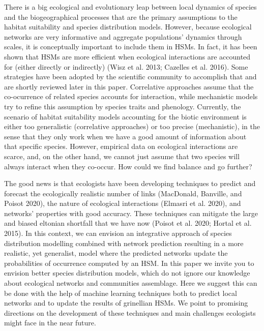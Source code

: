 \documentclass[11pt]{article}
\begin{document}
There is a big ecological and evolutionary leap between local dynamics
of species and the biogeographical processes that are the primary
assumptions to the habitat suitability and species distribution models.
However, because ecological networks are very informative and aggregate
populations' dynamics through scales, it is conceptually important to
include them in HSMs. In fact, it has been shown that HSMs are more
efficient when ecological interactions are accounted for (either
directly or indirectly) (Wisz et al. 2013; Cazelles et al. 2016). Some
strategies have been adopted by the scientific community to accomplish
that and are shortly reviewed later in this paper. Correlative
approaches assume that the co-ocurrence of related species accounts for
interaction, while mechanistic models try to refine this assumption by
species traits and phenology. Currently, the scenario of habitat
suitability models accounting for the biotic environment is either too
generalistic (correlative approaches) or too precise (mechanistic), in
the sense that they only work when we have a good amount of information
about that specific species. However, empirical data on ecological
interactions are scarce, and, on the other hand, we cannot just assume
that two species will always interact when they co-occur. How could we
find balance and go further?

The good news is that ecologists have been developing techniques to
predict and forecast the ecologically realistic number of links
(MacDonald, Banville, and Poisot 2020), the nature of ecological
interactions (Elmasri et al. 2020), and networks' properties with good
accuracy. These techniques can mitigate the large and biased eltonian
shortfall that we have now (Poisot et al. 2020; Hortal et al. 2015). In
this context, we can envision an integrative approach of species
distribution modelling combined with network prediction resulting in a
more realistic, yet generalist, model where the predicted networks
update the probabilities of occurrence computed by an HSM. In this paper
we invite you to envision better species distribution models, which do
not ignore our knowledge about ecological networks and communities
assemblage. Here we suggest this can be done with the help of machine
learning techniques both to predict local networks and to update the
results of grinellian HSMs. We point to promising directions on the
development of these techniques and main challenges ecologists might
face in the near future.
\end{document}
